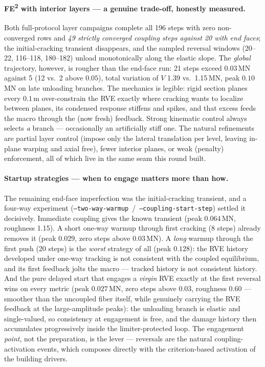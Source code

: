 \paragraph{FE\textsuperscript{2} with interior layers --- a genuine
trade-off, honestly measured.} Both full-protocol layer campaigns
complete all 196 steps with zero non-converged rows and \emph{49
strictly converged coupling steps against 20 with end faces}; the
initial-cracking transient disappears, and the sampled reversal
windows (20--22, 116--118, 180--182) unload monotonically along the
elastic slope. The \emph{global} trajectory, however, is rougher than
the end-face run: 21 steps exceed $0.03$\,MN against 5 (12 vs.\ 2
above $0.05$), total variation of $V$ 1.39 vs.\ 1.15\,MN, peak
$0.10$\,MN on late unloading branches. The mechanics is legible:
rigid section planes every $0.1$\,m over-constrain the RVE exactly
where cracking wants to localize between planes, its condensed
response stiffens and spikes, and that excess feeds the macro through
the (now fresh) feedback. Strong kinematic control always selects
\emph{a} branch --- occasionally an artificially stiff one. The
natural refinements are partial layer control (impose only the
lateral translation per level, leaving in-plane warping and axial
free), fewer interior planes, or weak (penalty) enforcement, all of
which live in the same seam this round built.

\paragraph{Startup strategies --- when to engage matters more than
how.} The remaining end-face imperfection was the initial-cracking
transient, and a four-way experiment
(\texttt{--two-way-warmup}~/~\texttt{--coupling-start-step}) settled
it decisively. Immediate coupling gives the known transient (peak
$0.064$\,MN, roughness 1.15). A short one-way warmup through first
cracking (8 steps) already removes it (peak $0.029$, zero steps above
$0.03$\,MN). A \emph{long} warmup through the first push (20 steps) is
the \emph{worst} strategy of all (peak $0.128$): the RVE history
developed under one-way tracking is not consistent with the coupled
equilibrium, and its first feedback jolts the macro --- tracked
history is not consistent history. And the pure delayed start that
engages a \emph{virgin} RVE exactly at the first reversal wins on
every metric (peak $0.027$\,MN, zero steps above $0.03$, roughness
$0.60$ --- smoother than the uncoupled fiber itself, while genuinely
carrying the RVE feedback at the large-amplitude peaks): the
unloading branch is elastic and single-valued, so consistency at
engagement is free, and the damage history then accumulates
progressively inside the limiter-protected loop. The engagement
\emph{point}, not the preparation, is the lever --- reversals are the
natural coupling-activation events, which composes directly with the
criterion-based activation of the building drivers.

